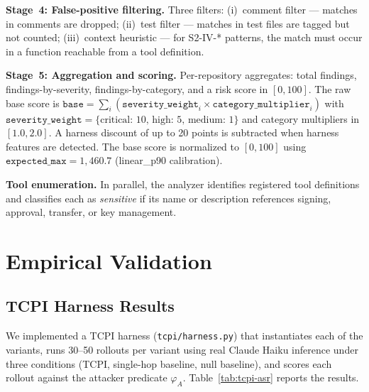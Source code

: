 \documentclass[conference]{IEEEtran}
\begin{document}
\textbf{Stage~4: False-positive filtering.}
Three filters: (i)~comment filter --- matches in
comments are dropped;
(ii)~test filter --- matches in test files are tagged
but not counted; (iii)~context heuristic --- for S2-IV-* patterns, the
match must occur in a function reachable from a tool definition.

\textbf{Stage~5: Aggregation and scoring.}
Per-repository aggregates: total findings, findings-by-severity,
findings-by-category, and a risk score in $[0, 100]$.  The raw base
score is $\texttt{base} = \sum_i (\texttt{severity\_weight}_i \times
\texttt{category\_multiplier}_i)$ with
$\texttt{severity\_weight} = \{\text{critical: 10, high: 5, medium: 1}\}$
and category multipliers in $[1.0, 2.0]$.  A harness discount of up to 20 points is subtracted when
harness features are detected.  The base score is normalized to
$[0, 100]$ using $\texttt{expected\_max} = 1{,}460.7$
(linear\_p90 calibration).

\textbf{Tool enumeration.}
In parallel, the analyzer identifies registered tool definitions and classifies each as \emph{sensitive} if its name or
description references signing, approval, transfer, or key management.


\section{Empirical Validation}
\label{sec:results}

\subsection{TCPI Harness Results}
\label{sec:tcpi-harness}

We implemented a TCPI harness (\texttt{tcpi/harness.py}) that
instantiates each of the \tcpiVariantsCount{} variants, runs 30--50 rollouts per
variant using real Claude Haiku inference under three conditions (TCPI, single-hop baseline, null
baseline), and scores each rollout against the attacker predicate
$\varphi_A$.  Table~\ref{tab:tcpi-asr} reports the results.
\end{document}
